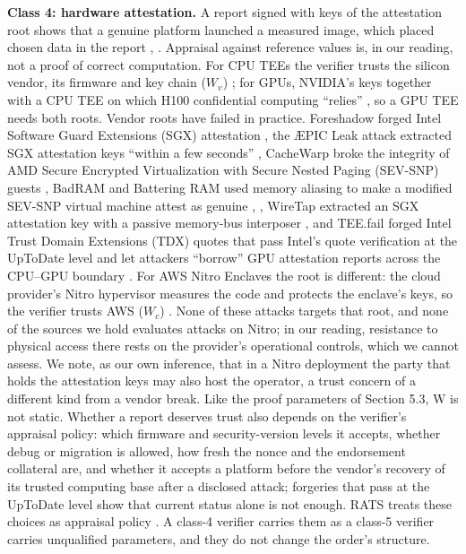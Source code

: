 \documentclass[11pt]{article}
\begin{document}
\textbf{Class 4: hardware attestation.} A report signed with keys of the attestation root shows that a genuine platform launched a measured image, which placed chosen data in the report \cite{B2}, \cite{B5}. Appraisal against reference values \cite{B5} is, in our reading, not a proof of correct computation. For CPU TEEs the verifier trusts the silicon vendor, its firmware and key chain ($W_v$) \cite{B3}; for GPUs, NVIDIA's keys together with a CPU TEE on which H100 confidential computing ``relies'' \cite{B6}, so a GPU TEE needs both roots. Vendor roots have failed in practice. Foreshadow forged Intel Software Guard Extensions (SGX) attestation \cite{B13}, the \AE{}PIC Leak attack extracted SGX attestation keys ``within a few seconds'' \cite{B14}, CacheWarp broke the integrity of AMD Secure Encrypted Virtualization with Secure Nested Paging (SEV-SNP) guests \cite{B15}, BadRAM and Battering RAM used memory aliasing to make a modified SEV-SNP virtual machine attest as genuine \cite{B27}, \cite{B28}, WireTap extracted an SGX attestation key with a passive memory-bus interposer \cite{B29}, and TEE.fail forged Intel Trust Domain Extensions (TDX) quotes that pass Intel's quote verification at the UpToDate level and let attackers ``borrow'' GPU attestation reports across the CPU--GPU boundary \cite{B16}. For AWS Nitro Enclaves the root is different: the cloud provider's Nitro hypervisor measures the code and protects the enclave's keys, so the verifier trusts AWS ($W_c$) \cite{B24}. None of these attacks targets that root, and none of the sources we hold evaluates attacks on Nitro; in our reading, resistance to physical access there rests on the provider's operational controls, which we cannot assess. We note, as our own inference, that in a Nitro deployment the party that holds the attestation keys may also host the operator, a trust concern of a different kind from a vendor break. Like the proof parameters of Section 5.3, W is not static. Whether a report deserves trust also depends on the verifier's appraisal policy: which firmware and security-version levels it accepts, whether debug or migration is allowed, how fresh the nonce and the endorsement collateral are, and whether it accepts a platform before the vendor's recovery of its trusted computing base after a disclosed attack; forgeries that pass at the UpToDate level \cite{B16} show that current status alone is not enough. RATS treats these choices as appraisal policy \cite{B5}. A class-4 verifier carries them as a class-5 verifier carries unqualified parameters, and they do not change the order's structure.
\end{document}
